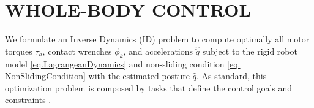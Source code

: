 \documentclass[letterpaper, 10 pt, conference]{ieeeconf}  %
\begin{document}

\section{WHOLE-BODY CONTROL}\label{Sec.WholeBodyControl}

We formulate an Inverse Dynamics (ID) problem to compute optimally all motor torques 
$\tau_{a}$, contact wrenches $ \phi_k $, and accelerations $ \hat{\ddot{q}} $ subject to the rigid robot model \eqref{eq.LagrangeanDynamics} and non-sliding condition \eqref{eq. NonSlidingCondition} with the estimated posture $\hat{q}$.
%
%
As standard, this optimization problem is composed by tasks that define the control goals and constraints \cite{adelprete:jnrh:2016, Noelie_2022_TSID}. 
%
\end{document}
